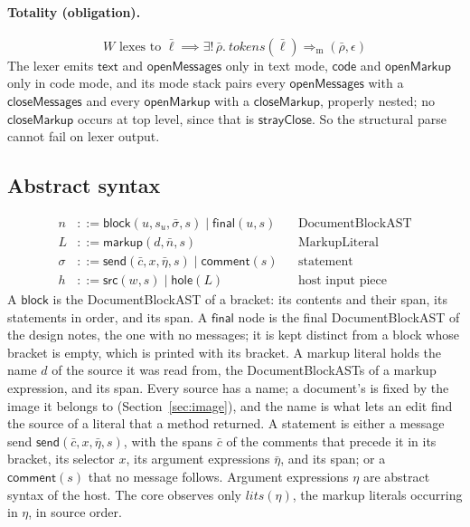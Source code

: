 \documentclass[11pt]{article}
\numberwithin{equation}{section}
\newcommand{\kw}[1]{\ensuremath{\mathsf{#1}}}
\begin{document}
\paragraph{Totality (obligation).}
\begin{equation}\label{eq:structural-totality}
W \text{ lexes to } \bar\ell
\implies
\exists!\, \bar\rho.\ \mathit{tokens}(\bar\ell) \Rightarrow_{\mathrm{m}}
  (\bar\rho, \epsilon)
\end{equation}
The lexer emits $\kw{text}$ and $\kw{openMessages}$ only in text mode,
$\kw{code}$ and $\kw{openMarkup}$ only in code mode, and its mode stack
pairs every $\kw{openMessages}$ with a $\kw{closeMessages}$ and every
$\kw{openMarkup}$ with a $\kw{closeMarkup}$, properly nested; no
$\kw{closeMarkup}$ occurs at top level, since that is
$\kw{strayClose}$.  So the structural parse cannot fail on lexer output.

\subsection{Abstract syntax}

\begin{equation}\label{eq:abstract-syntax}
\begin{aligned}
n &::= \kw{block}(u, s_u, \bar\sigma, s) \mid \kw{final}(u, s)
  && \text{DocumentBlockAST} \\
L &::= \kw{markup}(d, \bar n, s) && \text{MarkupLiteral} \\
\sigma &::= \kw{send}(\bar c, x, \bar\eta, s) \mid \kw{comment}(s)
  && \text{statement} \\
h &::= \kw{src}(w, s) \mid \kw{hole}(L) && \text{host input piece}
\end{aligned}
\end{equation}
A $\kw{block}$ is the DocumentBlockAST of a bracket: its contents and their
span, its statements in order, and its span.  A $\kw{final}$ node is the
final DocumentBlockAST of the design notes, the one with no messages; it is
kept distinct from a block whose bracket is empty, which is printed with
its bracket.  A markup literal holds the name $d$ of the source it was read
from, the DocumentBlockASTs of a markup expression, and its span.  Every
source has a name; a document's is fixed by the image it belongs to
(Section~\ref{sec:image}), and the name is what lets an edit find the source
of a literal that a method returned.  A statement is either a message send
$\kw{send}(\bar c, x, \bar\eta, s)$, with the spans $\bar c$ of the comments
that precede it in its bracket, its selector $x$, its argument expressions
$\bar\eta$, and its span; or a $\kw{comment}(s)$ that no message follows.
Argument expressions $\eta$ are abstract syntax of the host.  The core
observes only $\mathit{lits}(\eta)$, the markup literals occurring in
$\eta$, in source order.
\end{document}
